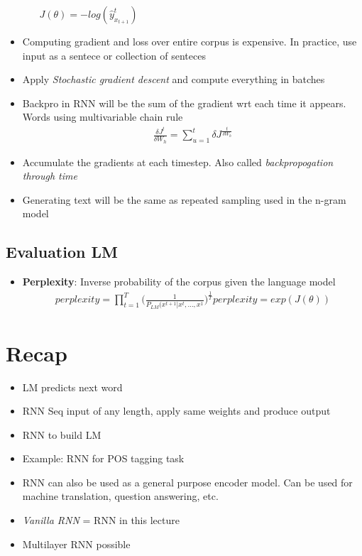 \documentclass[a4paper]{article}
\begin{document}
\begin{itemize}
\begin{itemize}
                $J(\theta) = -log(\hat{y}^t_{x_{t+1}})$
        \end{itemize}
    \item Computing gradient and loss over entire corpus is expensive. In practice, use input as a sentece or collection of senteces
    \item Apply \textit{Stochastic gradient descent} and compute everything in batches
    \item Backpro in RNN will be the sum of the gradient wrt each time it appears. Words using multivariable chain rule
    \begin{equation}
    \begin{split}
        \frac{\delta J^t}{\delta W_h} = \sum_{u=1}^{t} \delta J^\frac{t}{\delta W_h}
    \end{split}
    \end{equation}
    \item Accumulate the gradients at each timestep. Also called \textit{backpropogation through time} 
    \item Generating text will be the same as repeated sampling used in the n-gram model
\end{itemize}
\subsection{Evaluation LM}
\begin{itemize}
    \item \textbf{Perplexity}: Inverse probability of the corpus given the language model  
    \begin{equation}
    \begin{split}
        perplexity = \prod_{t=1}^T \bigg( \frac{1}{P_{LM}(x^{t+1}|x^t,...,x^1}\bigg )^{\frac{1}{T}}
        perplexity = exp(J(\theta))
    \end{split}
    \end{equation}
\end{itemize}
\section{Recap}
\begin{itemize}
    \item LM predicts next word
    \item RNN Seq input of any length, apply same weights and produce output
    \item RNN to build LM
    \item Example: RNN for POS tagging task
    \item RNN can also be used as a general purpose encoder model. Can be used for machine translation, question answering, etc.
    \item \textit{Vanilla RNN} = RNN in this lecture 
    \item Multilayer RNN possible
\end{itemize}
\end{document}
